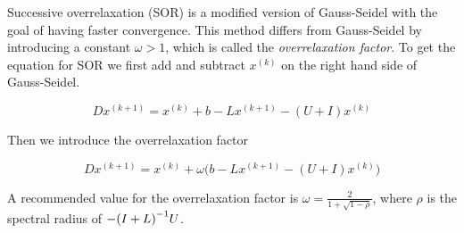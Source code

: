Successive overrelaxation (SOR) is a modified version of Gauss-Seidel with the
goal of having faster convergence\cite{Kreyszig}. This method differs from Gauss-Seidel by
introducing a constant $\omega > 1$, which is called the \emph{overrelaxation
factor}. To get the equation for SOR we first add and subtract $x^{(k)}$ on the right 
hand side of Gauss-Seidel.

$$ Dx^{(k+1)} = x^{(k)} + b - Lx^{(k+1)} - (U + I)x^{(k)} $$

Then we introduce the overrelaxation factor

$$ Dx^{(k+1)} = x^{(k)} + \omega \big( b - Lx^{(k+1)} - (U + I)x^{(k)} \big) $$

A recommended value for the overrelaxation factor is $\omega = \frac{2}{1 +
\sqrt{1 - \rho}} $, where $\rho$ is the spectral radius of $-{(I + L)}^{-1}U$\cite{Kreyszig}. 
